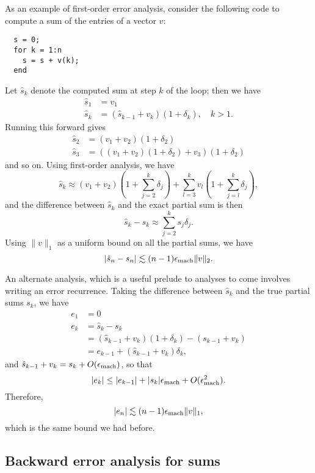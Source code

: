 \documentclass[12pt, leqno]{article} %
\begin{document}
As an example of first-order error analysis, consider the following
code to compute a sum of the entries of a vector $v$:
\begin{lstlisting}
  s = 0;
  for k = 1:n
    s = s + v(k);
  end
\end{lstlisting}
Let $\hat{s}_k$ denote the computed sum at step $k$ of the loop;
then we have
\begin{align*}
  \hat{s}_1 &= v_1 \\
  \hat{s}_k &= (\hat{s}_{k-1} + v_k)(1 + \delta_k), \quad k > 1.
\end{align*}
Running this forward gives
\begin{align*}
  \hat{s}_2 &= (v_1 + v_2)(1+\delta_2) \\
  \hat{s}_3 &= ((v_1 + v_2)(1+\delta_2) + v_3)(1+\delta_2)
\end{align*}
and so on.  Using first-order analysis, we have
\[
  \hat{s}_k \approx (v_1 + v_2)\left(1 + \sum_{j=2}^k \delta_j \right)
              + \sum_{l=3}^k v_l \left( 1 + \sum_{j=l}^k \delta_j \right),
\]
and the difference between $\hat{s}_k$ and the exact partial sum
is then
\[
  \hat{s}_k-s_k \approx \sum_{j=2}^k s_j \delta_j.
\]
Using $\|v\|_1$ as a uniform bound on all the partial sums, we have
\[
  |\hat{s}_n-s_n| \lesssim (n-1) \epsilon_{\mathrm{mach}} \|v\|_2.
\]

An alternate analysis, which is a useful prelude to analyses to come
involves writing an error recurrence.
Taking the difference between $\hat{s}_k$ and the true partial sums $s_k$,
we have
\begin{align*}
  e_1 &= 0 \\
  e_{k} &= \hat{s}_k-s_k \\
        &= (\hat{s}_{k-1} + v_k)(1+\delta_k) - (s_{k-1} + v_k) \\
        &= e_{k-1} + (\hat{s}_{k-1} + v_k) \delta_k,
\end{align*}
and $\hat{s}_{k-1} + v_k = s_k + O(\epsilon_{\mathrm{mach}})$, so that
\[
  |e_{k}| \leq |e_{k-1}| + |s_k| \epsilon_{\mathrm{mach}} + O(\epsilon_{\mathrm{mach}}^2).
\]
Therefore,
\[
  |e_{n}| \lesssim (n-1) \epsilon_{\mathrm{mach}} \|v\|_1,
\]
which is the same bound we had before.

\subsection{Backward error analysis for sums}
\end{document}

